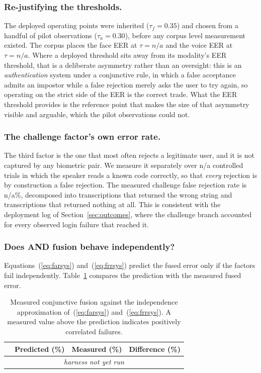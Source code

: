\documentclass[runningheads]{llncs}
\providecommand{\EvalFaceEERTau}{n/a}
\providecommand{\EvalVoiceEERTau}{n/a}
\providecommand{\EvalChallengeFRR}{n/a}
\providecommand{\EvalChallengeTrials}{n/a}
\providecommand{\EvalIndependenceRows}{\multicolumn{4}{c}{\textit{harness not yet run}}\\}
\begin{document}
{\subsubsection{Re-justifying the thresholds.}
The deployed operating points were inherited ($\tau_f=0.35$) and chosen from a handful of pilot observations ($\tau_a=0.30$), before any corpus level measurement existed. The corpus places the face EER at $\tau=\EvalFaceEERTau$ and the voice EER at $\tau=\EvalVoiceEERTau$. Where a deployed threshold sits away from its modality's EER threshold, that is a deliberate asymmetry rather than an oversight: this is an \emph{authentication} system under a conjunctive rule, in which a false acceptance admits an impostor while a false rejection merely asks the user to try again, so operating on the strict side of the EER is the correct trade. What the EER threshold provides is the reference point that makes the size of that asymmetry visible and arguable, which the pilot observations could not.

\subsubsection{The challenge factor's own error rate.}
The third factor is the one that most often rejects a legitimate user, and it is not captured by any biometric pair. We measure it separately over \EvalChallengeTrials{} controlled trials in which the speaker reads a known code correctly, so that \emph{every} rejection is by construction a false rejection. The measured challenge false rejection rate is \EvalChallengeFRR\%, decomposed into transcriptions that returned the wrong string and transcriptions that returned nothing at all. This is consistent with the deployment log of Section~\ref{sec:outcomes}, where the challenge branch accounted for every observed login failure that reached it.

\subsubsection{Does AND fusion behave independently?}
Equations~(\ref{eq:farsys}) and~(\ref{eq:frrsys}) predict the fused error only if the factors fail independently. Table~\ref{tab:independence} compares the prediction with the measured fused error.

\begin{table}[!t]
\caption{Measured conjunctive fusion against the independence approximation of~(\ref{eq:farsys}) and~(\ref{eq:frrsys}). A measured value above the prediction indicates positively correlated failures.}
\label{tab:independence}
\centering
\renewcommand{\arraystretch}{1.18}
\footnotesize
\begin{tabular}{lrrr}
\toprule
& \textbf{Predicted (\%)} & \textbf{Measured (\%)} & \textbf{Difference (\%)} \\
\midrule
\EvalIndependenceRows
\bottomrule
\end{tabular}
\end{table}

}
\end{document}
